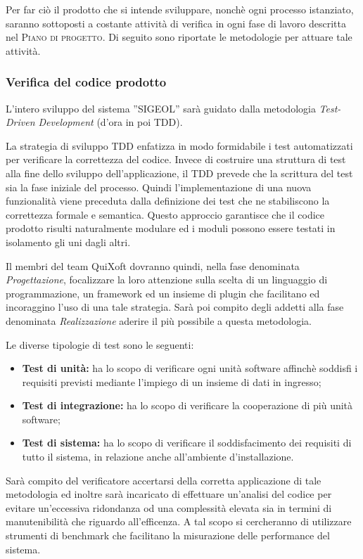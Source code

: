 \documentclass[11pt,a4paper]{article}
\begin{document}
Per far ciò il prodotto che si intende sviluppare, nonchè ogni processo istanziato, saranno sottoposti a costante attività di verifica in ogni fase di lavoro descritta nel \textsc{Piano di progetto}. Di seguito sono riportate le metodologie per attuare tale attività.
\subsubsection{Verifica del codice prodotto}
L'intero sviluppo del sistema ''SIGEOL'' sarà guidato dalla metodologia \textit{Test-Driven Development} (d'ora in poi TDD).

La strategia di sviluppo TDD enfatizza in modo formidabile i test automatizzati per verificare la correttezza del codice. Invece di costruire una struttura di test alla fine dello sviluppo dell’applicazione, il TDD prevede che la scrittura del test sia la fase iniziale del processo. Quindi l’implementazione di una nuova funzionalità viene preceduta dalla definizione dei test che ne stabiliscono la correttezza formale e semantica. Questo approccio garantisce che il codice prodotto risulti naturalmente modulare ed i moduli possono essere testati in isolamento gli uni dagli altri.

Il membri del team QuiXoft dovranno quindi, nella fase denominata \textit{Progettazione}, focalizzare la loro attenzione sulla scelta di un linguaggio di programmazione, un framework ed un insieme di plugin che facilitano ed incoraggino l'uso di una tale strategia. Sarà poi compito degli addetti alla fase denominata \textit{Realizzazione} aderire il più possibile a questa metodologia.

Le diverse tipologie di test sono le seguenti:
\begin{itemize}
	\item \textbf{Test di unità:} ha lo scopo di verificare ogni unità software affinchè soddisfi i requisiti previsti mediante l’impiego di un insieme di dati in ingresso;
	\item \textbf{Test di integrazione:} ha lo scopo di verificare la cooperazione di più unità software;
	\item \textbf{Test di sistema:} ha lo scopo di verificare il soddisfacimento dei requisiti di tutto il sistema, in relazione anche all'ambiente d'installazione.
\end{itemize}
Sarà compito del verificatore accertarsi della corretta applicazione di tale metodologia ed inoltre sarà incaricato di effettuare un'analisi del codice per evitare un'eccessiva ridondanza od una complessità elevata sia in termini di manutenibilità che riguardo all'efficenza. A tal scopo si cercheranno di utilizzare strumenti di benchmark che facilitano la misurazione delle performance del sistema.
\end{document}
